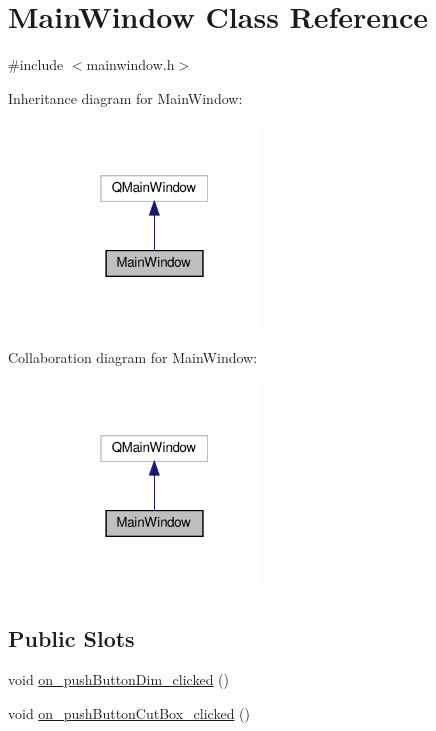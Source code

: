\hypertarget{class_main_window}{}\section{Main\+Window Class Reference}
\label{class_main_window}


{\ttfamily \#include $<$mainwindow.\+h$>$}



Inheritance diagram for Main\+Window\+:
\nopagebreak
\begin{figure}[H]
\begin{center}
\leavevmode
\includegraphics[width=160pt]{class_main_window__inherit__graph}
\end{center}
\end{figure}


Collaboration diagram for Main\+Window\+:
\nopagebreak
\begin{figure}[H]
\begin{center}
\leavevmode
\includegraphics[width=160pt]{class_main_window__coll__graph}
\end{center}
\end{figure}
\subsection*{Public Slots}
\begin{DoxyCompactItemize}
\item 
void \hyperlink{class_main_window_adc0db0162938df94fcb275684e6575a7}{on\+\_\+push\+Button\+Dim\+\_\+clicked} ()
\item 
void \hyperlink{class_main_window_affe842d33f32e0433f150f1a5acef774}{on\+\_\+push\+Button\+Cut\+Box\+\_\+clicked} ()
\end{DoxyCompactItemize}
